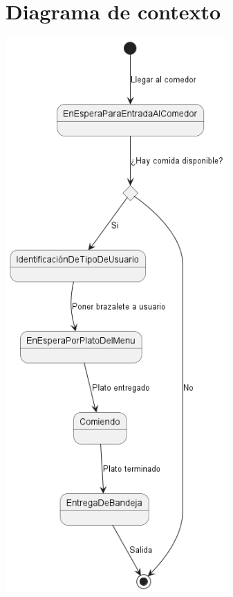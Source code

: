 \documentclass[12pt]{article}
\begin{document}
    \section{Diagrama de contexto}
        \begin{center}
            \vfill
            \includegraphics[width=8.5cm]{Partes/DiagramaEstados.png}
            \vfill
        \end{center}
\end{document}
